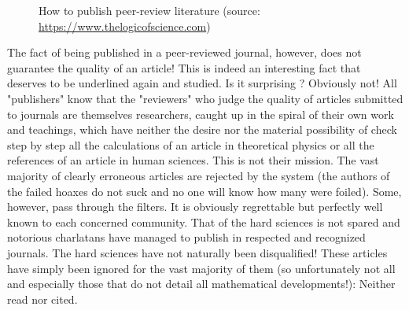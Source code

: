 \begin{figure}[H]
{}
		\vspace*{3mm}
		\caption[How to publish peer-review literature]{How to publish peer-review literature (source: \url{https://www.thelogicofscience.com})}
	\end{figure}
	
	The fact of being published in a peer-reviewed journal, however, does not guarantee the quality of an article! This is indeed an interesting fact that deserves to be underlined again and studied. Is it surprising ? Obviously not! All "publishers" know that the "reviewers" who judge the quality of articles submitted to journals are themselves researchers, caught up in the spiral of their own work and teachings, which have neither the desire nor the material possibility of check step by step all the calculations of an article in theoretical physics or all the references of an article in human sciences. This is not their mission. The vast majority of clearly erroneous articles are rejected by the system (the authors of the failed hoaxes do not suck and no one will know how many were foiled). Some, however, pass through the filters. It is obviously regrettable but perfectly well known to each concerned community. That of the hard sciences is not spared and notorious charlatans have managed to publish in respected and recognized journals. The hard sciences have not naturally been disqualified! These articles have simply been ignored for the vast majority of them (so unfortunately not all and especially those that do not detail all mathematical developments!): Neither read nor cited.
	
